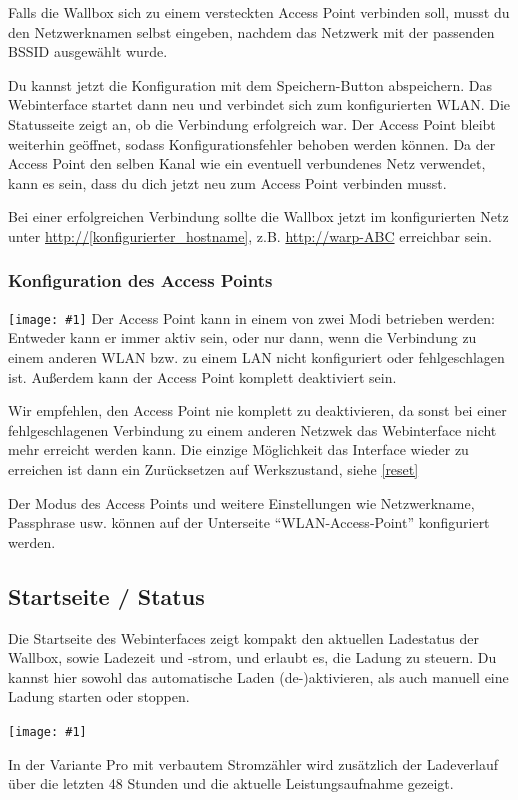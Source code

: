 \documentclass[a4paper,10pt]{article}
\newcommand{\hint}[1]{\begin{tcolorbox}[colback=boxgray,colframe=black,coltext=
white,title=Hinweis]#1\end{tcolorbox}}
\newcommand{\gfx}[1]{\texttt{[image: \#1]}}
\begin{document}
\begin{multicols*}{2}
	Falls die Wallbox sich zu einem versteckten Access Point verbinden soll, musst du den Netzwerknamen selbst eingeben,
	nachdem das Netzwerk mit der passenden BSSID ausgewählt wurde.


	Du kannst jetzt die Konfiguration mit dem Speichern-Button abspeichern.
	Das Webinterface startet dann neu und verbindet sich zum konfigurierten WLAN. Die Statusseite zeigt
	an, ob die Verbindung erfolgreich war. Der Access Point bleibt weiterhin
	geöffnet, sodass Konfigurationsfehler behoben werden können.
	Da der Access Point den selben Kanal wie ein eventuell verbundenes Netz verwendet,
	kann es sein, dass du dich jetzt neu zum Access Point verbinden musst.

	Bei einer erfolgreichen Verbindung sollte die Wallbox jetzt im konfigurierten Netz unter
	\url{http://[konfigurierter_hostname]}, z.B. \url{http://warp-ABC} erreichbar sein.

	\newpage
	\subsubsection{Konfiguration des Access Points}
	\gfx{./img_warp2/resized/web_wifi_ap}
	Der Access Point kann in einem von zwei Modi betrieben werden: Entweder kann er immer aktiv sein,
	oder nur dann, wenn die Verbindung zu einem anderen WLAN bzw. zu einem LAN nicht konfiguriert oder fehlgeschlagen ist.
	Außerdem kann der Access Point komplett deaktiviert sein.
	\hint{Wir empfehlen, den Access Point nie komplett zu deaktivieren, da sonst bei einer
		fehlgeschlagenen Verbindung zu einem anderen Netzwek das Webinterface nicht mehr erreicht
		werden kann. Die einzige Möglichkeit das Interface wieder zu erreichen ist dann ein Zurücksetzen auf Werkszustand, siehe \ref{reset}}
	Der Modus des Access Points und weitere Einstellungen wie Netzwerkname, Passphrase usw. können
	auf der Unterseite \enquote{WLAN-Access-Point} konfiguriert werden.

	\subsection{Startseite / Status}
	Die Startseite des Webinterfaces zeigt kompakt den aktuellen Ladestatus der
	Wallbox, sowie Ladezeit und -strom, und erlaubt es, die Ladung zu steuern.
	Du kannst hier sowohl das automatische Laden (de-)aktivieren, als auch
	manuell eine Ladung starten oder stoppen.

	\gfx{./img_warp2/resized/web_status}

	In der Variante Pro mit verbautem Stromzähler wird zusätzlich der Ladeverlauf
	über die letzten 48 Stunden und die aktuelle Leistungsaufnahme gezeigt.


\end{multicols*}
\end{document}
